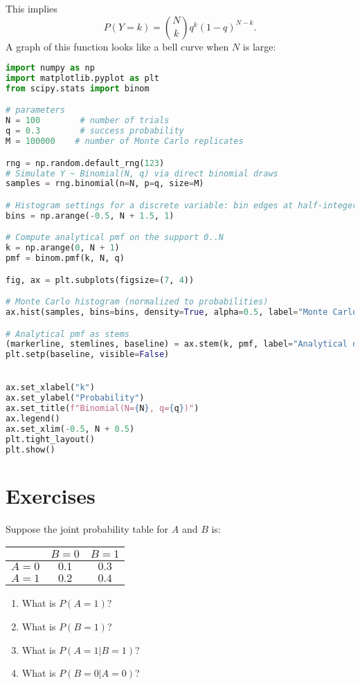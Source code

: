 This implies 
\begin{equation*}
P(Y=k)=  {N \choose k}q^{k}(1-q)^{N-k}. 
\end{equation*}
A graph of this function looks like a bell curve when $N$ is large: 
\begin{lstlisting}[language=Python]
import numpy as np
import matplotlib.pyplot as plt
from scipy.stats import binom

# parameters
N = 100        # number of trials
q = 0.3        # success probability
M = 100000    # number of Monte Carlo replicates

rng = np.random.default_rng(123)
# Simulate Y ~ Binomial(N, q) via direct binomial draws
samples = rng.binomial(n=N, p=q, size=M)

# Histogram settings for a discrete variable: bin edges at half-integers
bins = np.arange(-0.5, N + 1.5, 1)

# Compute analytical pmf on the support 0..N
k = np.arange(0, N + 1)
pmf = binom.pmf(k, N, q)

fig, ax = plt.subplots(figsize=(7, 4))

# Monte Carlo histogram (normalized to probabilities)
ax.hist(samples, bins=bins, density=True, alpha=0.5, label="Monte Carlo (hist)")

# Analytical pmf as stems
(markerline, stemlines, baseline) = ax.stem(k, pmf, label="Analytical distribution")
plt.setp(baseline, visible=False)


ax.set_xlabel("k")
ax.set_ylabel("Probability")
ax.set_title(f"Binomial(N={N}, q={q})")
ax.legend()
ax.set_xlim(-0.5, N + 0.5)
plt.tight_layout()
plt.show()
\end{lstlisting}

\newpage 

\section*{Exercises}
\begin{exercise}
Suppose the joint probability table for $A$ and $B$ is:
\begin{center}
\begin{tabular}{c|cc}
 & $B=0$ & $B=1$ \\
\hline
$A=0$ & $0.1$ & $0.3$ \\
$A=1$ & $0.2$ & $0.4$ \\
\end{tabular}
\end{center}
\begin{enumerate}[label=(\alph*)]
\item What is $P(A=1)$?
\item What is $P(B=1)$?
\item What is $P(A=1|B=1)$?
\item What is $P(B=0|A=0)$?
\end{enumerate}
\end{exercise}

